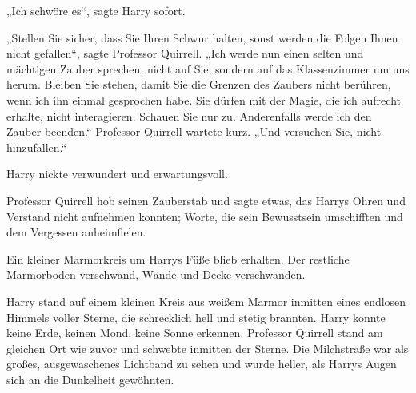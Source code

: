 „Ich schwöre es“, sagte Harry sofort.

„Stellen Sie sicher, dass Sie Ihren Schwur halten, sonst werden die Folgen Ihnen nicht gefallen“, sagte Professor Quirrell. „Ich werde nun einen selten und mächtigen Zauber sprechen, nicht auf Sie, sondern auf das Klassenzimmer um uns herum. Bleiben Sie stehen, damit Sie die Grenzen des Zaubers nicht berühren, wenn ich ihn einmal gesprochen habe. Sie dürfen mit der Magie, die ich aufrecht erhalte, nicht interagieren. Schauen Sie nur zu. Anderenfalls werde ich den Zauber beenden.“ Professor Quirrell wartete kurz. „Und versuchen Sie, nicht hinzufallen.“

Harry nickte verwundert und erwartungsvoll.

Professor Quirrell hob seinen Zauberstab und sagte etwas, das Harrys Ohren und Verstand nicht aufnehmen konnten; Worte, die sein Bewusstsein umschifften und dem Vergessen anheimfielen.

Ein kleiner Marmorkreis um Harrys Füße blieb erhalten. Der restliche Marmorboden verschwand, Wände und Decke verschwanden.

Harry stand auf einem kleinen Kreis aus weißem Marmor inmitten eines endlosen Himmels voller Sterne, die schrecklich hell und stetig brannten. Harry konnte keine Erde, keinen Mond, keine Sonne erkennen. Professor Quirrell stand am gleichen Ort wie zuvor und schwebte inmitten der Sterne. Die Milchstraße war als großes, ausgewaschenes Lichtband zu sehen und wurde heller, als Harrys Augen sich an die Dunkelheit gewöhnten.

